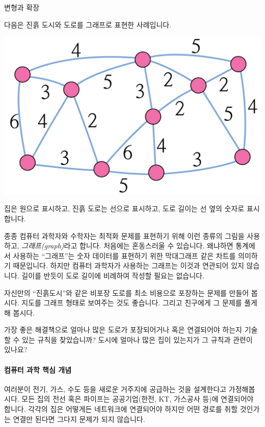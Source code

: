 \documentclass[]{article}
\begin{document}
변형과 확장

다음은 진흙 도시와 도로를 그래프로 표현한 사례입니다.

\includegraphics{csunplugged/02-part/img/ch09-spanning-tree/09-spanning-tree-02-muddy-city-graph.png}

집은 원으로 표시하고, 진흙 도로는 선으로 표시하고, 도로 길이는 선 옆의
숫자로 표시합니다.

종종 컴퓨터 과학자와 수학자는 최적화 문제를 표현하기 위해 이런 종류의
그림을 사용하고, \emph{그래프(graph)}라고 합니다. 처음에는 혼동스러울 수
있습니다. 왜냐하면 통계에서 사용하는 ``그래프''는 숫자 데이터를 표현하기
위한 막대그래프 같은 차트를 의미하기 때문입니다. 하지만 컴퓨터 과학자가
사용하는 그래프는 이것과 연관되어 있지 않습니다. 길이를 반듯이 도로
길이에 비례하여 작성할 필요는 없습니다.

자신만의 ``진흙도시''와 같은 비포장 도로를 최소 비용으로 포장하는 문제를
만들어 봅시다. 지도를 그래프 형태로 보여주는 것도 좋습니다. 그리고
친구에게 그 문제를 풀게 해 봅시다.

가장 좋은 해결책으로 얼마나 많은 도로가 포장되어거나 혹은 연결되어야
하는지 기술할 수 있는 규칙을 찾았습니까? 도시에 얼마나 많은 집이
있는지가 그 규칙과 관련이 있나요?

\mbox{}\paragraph{컴퓨터 과학 핵심 개념}\label{section-131}

여러분이 전기, 가스, 수도 등을 새로운 거주지에 공급하는 것을 설계한다고
가정해봅시다. 모든 집의 전선 혹은 파이프는 공공기업(한전, KT, 가스공사
등)에 연결되어야 합니다. 각각의 집은 어떻게든 네트워크에 연결되어야
하지만 어떤 경로를 취할 것인가는 연결만 된다면 그다지 문제가 되지
않습니다.
\end{document}
